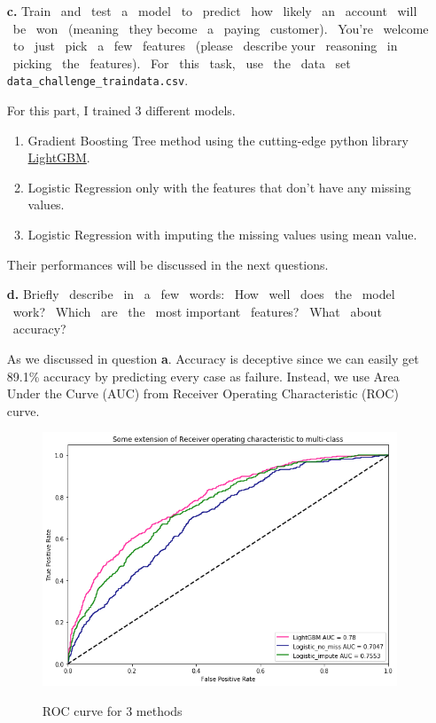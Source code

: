 \documentclass[12pt]{report}
\begin{document}
\begin{enumerate}
\begin{enumerate}
	\end{enumerate}

	\item[\textbf{c.}] Train  and  test  a  model  to  predict  how  likely  an  account  will  be  won  (meaning  they 
	become  a  paying  customer).  You’re  welcome  to  just  pick  a  few  features  (please  describe 
	your  reasoning  in  picking  the  features).  For  this  task,  use  the  data  set 
	\verb|data_challenge_traindata.csv|. 
	
	For this part, I trained 3 different models.
	\begin{enumerate}
		\item Gradient Boosting Tree method using the cutting-edge python library \href{https://github.com/Microsoft/LightGBM}{LightGBM}.
		
		\item Logistic Regression only with the features that don't have any missing values.
		
		\item Logistic Regression with imputing the missing values using mean value.
	\end{enumerate}
	
	Their performances will be discussed in the next questions.
	
	\item[\textbf{d.}] Briefly  describe  in  a  few  words:  How  well  does  the  model  work?  Which  are  the  most 
	important  features?  What  about  accuracy? 

	As we discussed in question \textbf{a}. Accuracy is deceptive since we can easily get 89.1\% accuracy by predicting every case as failure. Instead, we use Area Under the Curve (AUC) from Receiver Operating Characteristic (ROC) curve.
	
	\begin{figure}[h!]
		\caption{ROC curve for 3 methods}
		\centering
		\includegraphics[scale=.6]{roc.png}
		\label{roc}
	\end{figure}


\end{enumerate}
\end{document}
